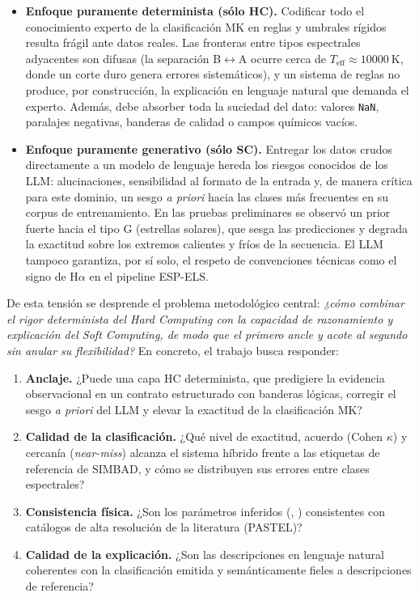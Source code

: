 \begin{itemize}
  \item \textbf{Enfoque puramente determinista (sólo HC).} Codificar todo el
  conocimiento experto de la clasificación MK en reglas y umbrales rígidos
  resulta frágil ante datos reales. Las fronteras entre tipos espectrales
  adyacentes son difusas (la separación B$\leftrightarrow$A ocurre cerca de
  $T_\mathrm{eff}\approx\SI{10000}{\kelvin}$, donde un corte duro genera errores
  sistemáticos), y un sistema de reglas no produce, por construcción, la
  explicación en lenguaje natural que demanda el experto. Además, debe absorber
  toda la suciedad del dato: valores \texttt{NaN}, paralajes negativas, banderas
  de calidad o campos químicos vacíos.

  \item \textbf{Enfoque puramente generativo (sólo SC).} Entregar los datos
  crudos directamente a un modelo de lenguaje hereda los riesgos conocidos de
  los LLM: alucinaciones, sensibilidad al formato de la entrada y, de manera
  crítica para este dominio, un sesgo \emph{a priori} hacia las clases más
  frecuentes en su corpus de entrenamiento. En las pruebas preliminares se
  observó un prior fuerte hacia el tipo G (estrellas solares), que sesga las
  predicciones y degrada la exactitud sobre los extremos calientes y fríos de
  la secuencia. El LLM tampoco garantiza, por sí solo, el respeto de
  convenciones técnicas como el signo de H$\alpha$ en el pipeline ESP-ELS.
\end{itemize}

De esta tensión se desprende el problema metodológico central: \emph{¿cómo
combinar el rigor determinista del Hard Computing con la capacidad de razonamiento y
explicación del Soft Computing, de modo que el primero ancle y acote al segundo 
sin anular su flexibilidad?} En concreto, el trabajo busca responder:

\begin{enumerate}
  \item \textbf{Anclaje.} ¿Puede una capa HC determinista, que predigiere la
  evidencia observacional en un contrato estructurado con banderas lógicas,
  corregir el sesgo \emph{a priori} del LLM y elevar la exactitud de la
  clasificación MK?
  \item \textbf{Calidad de la clasificación.} ¿Qué nivel de exactitud, acuerdo
  (Cohen $\kappa$) y cercanía (\emph{near-miss}) alcanza el sistema híbrido
  frente a las etiquetas de referencia de SIMBAD, y cómo se distribuyen sus
  errores entre clases espectrales?
  \item \textbf{Consistencia física.} ¿Son los parámetros inferidos (\teff,
  \logg) consistentes con catálogos de alta resolución de la literatura
  (PASTEL)?
  \item \textbf{Calidad de la explicación.} ¿Son las descripciones en lenguaje
  natural coherentes con la clasificación emitida y semánticamente fieles a
  descripciones de referencia?
\end{enumerate}

